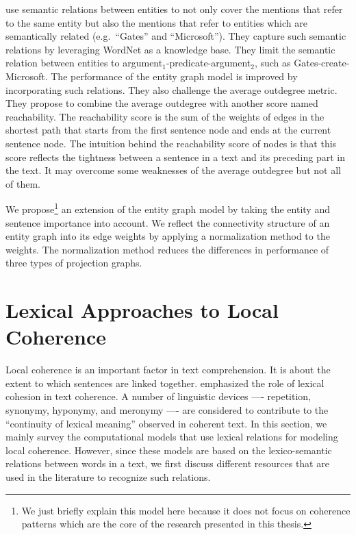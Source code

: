 use semantic relations between entities to not only cover 
the mentions that refer to the same entity but also the mentions that refer to entities which are semantically related (e.g.\ ``Gates'' and ``Microsoft''). 
They capture such semantic relations by leveraging WordNet \cite{baccianella10} as a knowledge base. 
They limit the semantic relation between entities to argument$_1$-predicate-argument$_2$, such as \mbox{Gates-create-Microsoft}. 
The performance of the entity graph model is improved by incorporating such relations. 
They also challenge the average outdegree metric.
They propose to combine the average outdegree with another score named reachability. 
The reachability score is the sum of the weights of edges in the shortest path that starts from the first sentence node and ends at the current sentence node. 
The intuition behind the reachability score of nodes is that this score reflects the tightness between a sentence in a text and its preceding part in the text. 
It may overcome some weaknesses of the average outdegree but not all of them.   

We propose\footnote{We just briefly explain this model here because it does not focus on coherence patterns which are the core of the research presented in this thesis.} \cite{mesgar14} an extension of the entity graph model by taking the entity and sentence importance into account. 
We reflect the connectivity structure of an entity graph into its edge weights by applying a normalization method to the weights.  
The normalization method reduces the differences in performance of three types of projection graphs.


\section{Lexical Approaches to Local Coherence}

Local coherence is an important factor in text comprehension.
It is about the extent to which sentences are linked together. 
 emphasized the role of lexical cohesion in text coherence. 
A number of linguistic devices —- repetition, synonymy, hyponymy, and meronymy —- are considered to contribute to the ``continuity of lexical meaning'' observed in coherent text. 
In this section, we mainly survey the computational models that use lexical relations for modeling local coherence. 
However, since these models are based on the lexico-semantic relations between words in a text, we first discuss different resources that are used in the literature to recognize such relations. 

